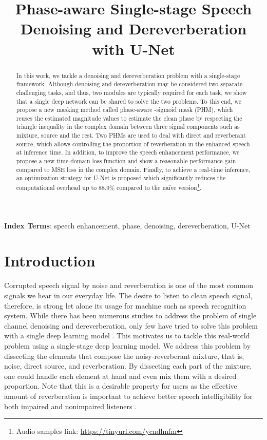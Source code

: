 \documentclass[a4paper]{article}
\title{Phase-aware Single-stage Speech Denoising and Dereverberation with U-Net}
\begin{document}
\maketitle
\begin{abstract}
  In this work, we tackle a denoising and dereverberation problem with a single-stage framework.
  Although denoising and dereverberation may be considered two separate challenging tasks, and thus, two modules are typically required for each task, we show that a single deep network can be shared to solve the two problems.
  To this end, we propose a new masking method called phase-aware -sigmoid mask (PHM), which reuses the estimated magnitude values to estimate the clean phase by respecting the triangle inequality in the complex domain between three signal components such as mixture, source and the rest. 
  Two PHMs are used to deal with direct and reverberant source, which allows controlling the proportion of reverberation in the enhanced speech at inference time.
  In addition, to improve the speech enhancement performance, we propose a new time-domain loss function and show a reasonable performance gain compared to MSE loss in the complex domain.
  Finally, to achieve a real-time inference, an optimization strategy for U-Net is proposed which significantly reduces the computational overhead up to 88.9\% compared to the naïve version\footnote{Audio samples link: \href{https://tinyurl.com/ycndlmfm}{https://tinyurl.com/ycndlmfm}}.

\end{abstract}
\noindent\textbf{Index Terms}: speech enhancement, phase, denoising, dereverberation, U-Net

\section{Introduction}
Corrupted speech signal by noise and reverberation is one of the most common signals we hear in our everyday life.
The desire to listen to clean speech signal, therefore, is strong let alone its usage for machine such as speech recognition system.
While there has been numerous studies to address the problem of single channel denoising and dereverberation, only few have tried to solve this problem with a single deep learning model \cite{sun2018enhanced}.
This motivates us to tackle this real-world problem using a single-stage deep learning model.
We address this problem by dissecting the elements that compose the noisy-reverberant mixture, that is, noise, direct source, and reverberation.
By dissecting each part of the mixture, one could handle each element at hand and even mix them with a desired proportion.
Note that this is a desirable property for users as the effective amount of reverberation is important to achieve better speech intelligibility for both impaired and nonimpaired listeners \cite{bradley2003importance, hu2014effects}.
\end{document}
